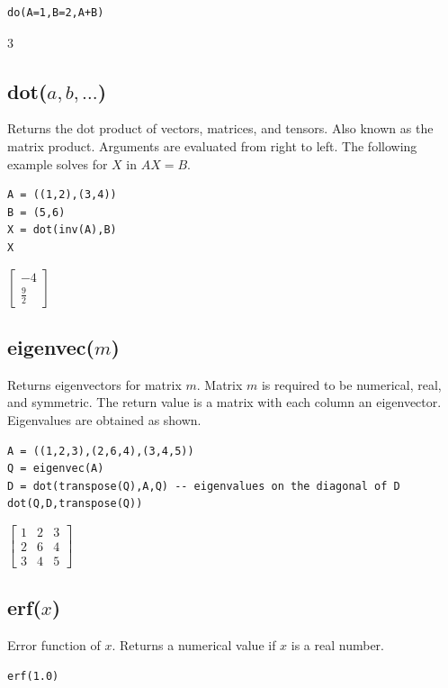 \documentclass[12pt]{article}
\begin{document}
{\color{blue}
\begin{verbatim}
do(A=1,B=2,A+B)
\end{verbatim}
}

$3$

\subsection*{dot($a,b,\ldots$)}

Returns the dot product of vectors, matrices, and tensors.
Also known as the matrix product.
Arguments are evaluated from right to left.
The following example solves for $X$ in $AX=B$.

{\color{blue}
\begin{verbatim}
A = ((1,2),(3,4))
B = (5,6)
X = dot(inv(A),B)
X
\end{verbatim}
}

$\displaystyle
\begin{bmatrix}
-4
\\[1ex]
\tfrac{9}{2}
\end{bmatrix}
$

\subsection*{eigenvec($m$)}

Returns eigenvectors for matrix $m$.
Matrix $m$ is required to be numerical, real, and symmetric.
The return value is a matrix with each column an eigenvector.
Eigenvalues are obtained as shown.

{\color{blue}
\begin{verbatim}
A = ((1,2,3),(2,6,4),(3,4,5))
Q = eigenvec(A)
D = dot(transpose(Q),A,Q) -- eigenvalues on the diagonal of D
dot(Q,D,transpose(Q))
\end{verbatim}
}

$\displaystyle
\begin{bmatrix}
1 & 2 & 3
\\[1ex]
2 & 6 & 4
\\[1ex]
3 & 4 & 5
\end{bmatrix}
$

\subsection*{erf($x$)}

Error function of $x$.
Returns a numerical value if $x$ is a real number.

{\color{blue}
\begin{verbatim}
erf(1.0)
\end{verbatim}
}
\end{document}
